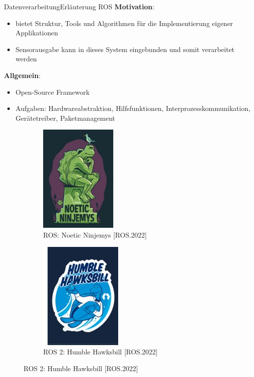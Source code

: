 \documentclass[169, handout	]{THIbeamer} %
\begin{document}
	\begin{frame}{Datenverarbeitung}{Erläuterung ROS}				
		\textbf{Motivation}: 
		\begin{itemize}
			\item bietet Struktur, Tools und Algorithmen für die Implementierung eigener Applikationen
			\item Sensorausgabe kann in dieses System eingebunden und somit verarbeitet werden
		\end{itemize}		
		\textbf{Allgemein}:
		\begin{itemize}
			\item Open-Source Framework
			\item Aufgaben: Hardwareabstraktion, Hilfsfunktionen, Interprozesskommunikation, Gerätetreiber, Paketmanagement
		\end{itemize}		
		\begin{figure}
			\centering
    		\begin{subfigure}[b]{0.4\textwidth}
				\includegraphics[scale=0.3]{required/ROS.jpg}
				\caption{ROS: Noetic Ninjemys [ROS.2022]}
        		\label{ROS}
   		 	\end{subfigure}
    		\begin{subfigure}[b]{0.4\textwidth}
				\includegraphics[scale=0.3]{required/ROS2.jpg}
				\caption{ROS 2: Humble Hawksbill [ROS.2022]}
        		\label{ROS}
    		\end{subfigure}
		\end{figure}			
	\end{frame}
\end{document}
